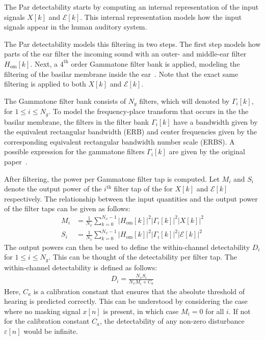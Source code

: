 The Par detectability starts by computing an internal representation of the input signals $X[k]$ and $\mathcal{E}[k]$.
This internal representation models how the input signals appear in the human auditory system.

The Par detectability models this filtering in two steps.
The first step models how parts of the ear filter the incoming sound with an outer- and middle-ear filter $H_\text{om}[k]$. 
Next, a $4^\text{th}$ order Gammatone filter bank is applied, modeling the filtering of the 
basilar membrane inside the ear~\cite{van2005perceptual}.
Note that the exact same filtering is applied to both $X[k]$ and $\mathcal{E}[k]$.

The Gammatone filter bank consists of $N_g$ filters, which will denoted by $\Gamma_i[k]$, for $1 \leq i \leq N_g$. 
To model the frequency-place transform that occurs in the the basilar membrane, 
the filters in the filter bank $\Gamma_i[k]$ have a bandwidth given by the equivalent 
rectangular bandwidth (ERB) and center frequencies given by the corresponding equivalent rectangular bandwidth number
scale (ERBS).
A possible expression for the gammatone filters $\Gamma_i[k]$ are given by the original paper~\cite{van2005perceptual}. 

After filtering, the power per Gammatone filter tap is computed.
Let $M_i$ and $S_i$ denote the output power of the $i^\text{th}$ filter tap of the for $X[k]$ and 
$\mathcal{E}[k]$ respectively.
The relationship between the input quantities and the output power of the filter taps can be given as follows:
\begin{align}
    M_i &= \frac{1}{N_x}\sum_{k=0}^{N_x-1}\left|H_\text{om}[k]\right|^2\left|\Gamma_i[k]\right|^2\left|X[k]\right|^2 \\
    S_i &= \frac{1}{N_x}\sum_{k=0}^{N_x-1}\left|H_\text{om}[k]\right|^2\left|\Gamma_i[k]\right|^2\left|\mathcal{E}[k]\right|^2 
\end{align}
The output powers can then be used to define the within-channel detectability $D_i$ for $1 \leq i \leq N_g$.
This can be thought of the detectability per filter tap.
The within-channel detectability is defined as follows:
\begin{align}
    D_i = \frac{N_xS_i}{N_xM_i + C_a}
\end{align}
Here, $C_a$ is a calibration constant that ensures that the absolute threshold of hearing is predicted correctly.
This can be understood by considering the case where no masking signal $x[n]$ is present, 
in which case $M_i = 0$ for all $i$.
If not for the calibration constant $C_a$, the detectability of any non-zero disturbance $\varepsilon[n]$ would be infinite.

